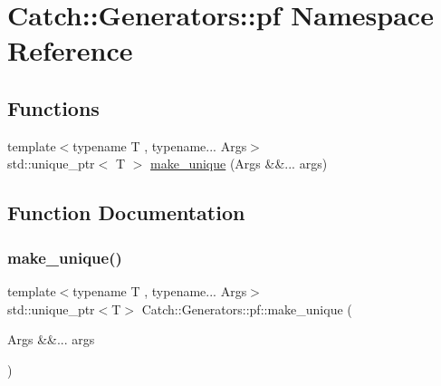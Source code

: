 \hypertarget{namespace_catch_1_1_generators_1_1pf}{}\section{Catch\+:\+:Generators\+:\+:pf Namespace Reference}
\label{namespace_catch_1_1_generators_1_1pf}
\subsection*{Functions}
\begin{DoxyCompactItemize}
\item 
{\footnotesize template$<$typename T , typename... Args$>$ }\\std\+::unique\+\_\+ptr$<$ T $>$ \mbox{\hyperlink{namespace_catch_1_1_generators_1_1pf_adb71cb1098062f6baaf86ec4feadae7d}{make\+\_\+unique}} (Args \&\&... args)
\end{DoxyCompactItemize}


\subsection{Function Documentation}
\mbox{\label{namespace_catch_1_1_generators_1_1pf_adb71cb1098062f6baaf86ec4feadae7d}} 
\subsubsection{\texorpdfstring{make\+\_\+unique()}{make\_unique()}}
{\footnotesize\ttfamily template$<$typename T , typename... Args$>$ \\
std\+::unique\+\_\+ptr$<$T$>$ Catch\+::\+Generators\+::pf\+::make\+\_\+unique (\begin{DoxyParamCaption}\item[{Args \&\&...}]{args }\end{DoxyParamCaption})}

